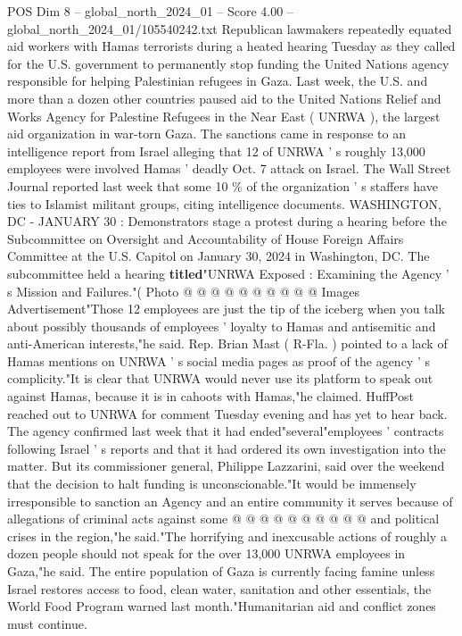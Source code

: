 \begin{textsample}{POS Dim 8 – global\_north\_2024\_01 – Score 4.00 – global\_north\_2024\_01/105540242.txt}  \label{ex:f8_pos_237}
Republican lawmakers repeatedly equated aid workers with Hamas terrorists during a heated hearing Tuesday as they called for the U.S. government to permanently stop funding the United Nations agency responsible for helping Palestinian refugees in Gaza.
Last week, the U.S. and more than a dozen other countries paused aid to the United Nations Relief and Works Agency for Palestine Refugees in the Near East ( UNRWA ), the largest aid organization in war-torn Gaza.
The sanctions came in response to an intelligence report from Israel alleging that 12 of UNRWA ' s roughly 13,000 employees were involved Hamas ' deadly Oct. 7 attack on Israel.
The Wall Street Journal reported last week that some 10 \% of the organization ' s staffers have ties to Islamist militant groups, citing intelligence documents.
WASHINGTON, DC - JANUARY 30 : Demonstrators stage a protest during a hearing before the Subcommittee on Oversight and Accountability of House Foreign Affairs Committee at the U.S.
Capitol on January 30, 2024 in Washington, DC.
The subcommittee held a hearing \textbf{titled}"UNRWA Exposed : Examining the Agency ' s Mission and Failures."( Photo @ @ @ @ @ @ @ @ @ @ Images Advertisement"Those 12 employees are just the tip of the iceberg when you talk about possibly thousands of employees ' loyalty to Hamas and antisemitic and anti-American interests,"he said.
Rep.
Brian Mast ( R-Fla. ) pointed to a lack of Hamas mentions on UNRWA ' s social media pages as proof of the agency ' s complicity."It is clear that UNRWA would never use its platform to speak out against Hamas, because it is in cahoots with Hamas,"he claimed.
HuffPost reached out to UNRWA for comment Tuesday evening and has yet to hear back.
The agency confirmed last week that it had ended"several"employees ' contracts following Israel ' s reports and that it had ordered its own investigation into the matter.
But its commissioner general, Philippe Lazzarini, said over the weekend that the decision to halt funding is unconscionable."It would be immensely irresponsible to sanction an Agency and an entire community it serves because of allegations of criminal acts against some @ @ @ @ @ @ @ @ @ @ and political crises in the region,"he said."The horrifying and inexcusable actions of roughly a dozen people should not speak for the over 13,000 UNRWA employees in Gaza,"he said.
The entire population of Gaza is currently facing famine unless Israel restores access to food, clean water, sanitation and other essentials, the World Food Program warned last month."Humanitarian aid and conflict zones must continue.

\end{textsample}

